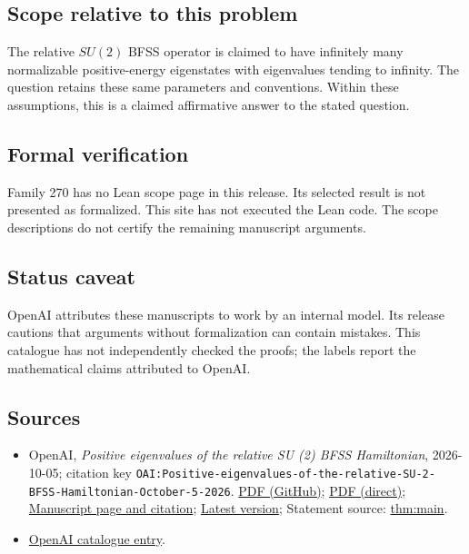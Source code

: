 \documentclass[11pt]{article}
\begin{document}
\subsection{Scope relative to this problem}
The relative $SU(2)$ BFSS operator is claimed to have infinitely many normalizable positive-energy eigenstates with eigenvalues tending to infinity. The question retains these same parameters and conventions. Within these assumptions, this is a claimed affirmative answer to the stated question.

\subsection{Formal verification}
Family 270 has no Lean scope page in this release. Its selected result is not presented as formalized. This site has not executed the Lean code. The scope descriptions do not certify the remaining manuscript arguments.

\subsection{Status caveat}
OpenAI attributes these manuscripts to work by an internal model. Its release cautions that arguments without formalization can contain mistakes. This catalogue has not independently checked the proofs; the labels report the mathematical claims attributed to OpenAI.

\subsection{Sources}
\begin{itemize}
\item OpenAI, \emph{Positive eigenvalues of the relative SU (2) BFSS Hamiltonian}, 2026-10-05; citation key \texttt{OAI:Positive-eigenvalues-of-the-relative-SU-2-BFSS-Hamiltonian-October-5-2026}. \href{https://github.com/openai/math/blob/adc7f1241b42e322a6451854ab7e4b4c146bf78a/preprints/Positive-eigenvalues-of-the-relative-SU-2-BFSS-Hamiltonian-October-5-2026/positive-eigenvalues-relative-su2-bfss.pdf}{PDF (GitHub)}; \href{https://github.com/openai/math/raw/adc7f1241b42e322a6451854ab7e4b4c146bf78a/preprints/Positive-eigenvalues-of-the-relative-SU-2-BFSS-Hamiltonian-October-5-2026/positive-eigenvalues-relative-su2-bfss.pdf}{PDF (direct)}; \href{https://github.com/openai/math/blob/adc7f1241b42e322a6451854ab7e4b4c146bf78a/preprints/Positive-eigenvalues-of-the-relative-SU-2-BFSS-Hamiltonian-October-5-2026/README.md}{Manuscript page and citation}; \href{https://github.com/openai/math/blob/main/preprints/Positive-eigenvalues-of-the-relative-SU-2-BFSS-Hamiltonian-October-5-2026/positive-eigenvalues-relative-su2-bfss.pdf}{Latest version}; Statement source: \href{https://github.com/openai/math/blob/adc7f1241b42e322a6451854ab7e4b4c146bf78a/preprints/Positive-eigenvalues-of-the-relative-SU-2-BFSS-Hamiltonian-October-5-2026/build/positive-eigenvalues-relative-su2-bfss.tex\#L135}{thm:main}.
\item \href{https://github.com/openai/math/blob/adc7f1241b42e322a6451854ab7e4b4c146bf78a/CONTENTS.md}{OpenAI catalogue entry}.
\end{itemize}
\end{document}
